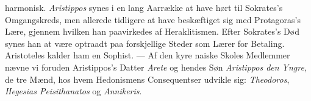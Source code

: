 \documentclass[12pt,a4paper]{book}
\newcommand{\gk}[1]{\textit{#1}}
\begin{document}
harmonisk. \emph{Aristippos} synes i en lang Aarrække at have
hørt til Sokrates's Omgangskreds, men allerede tidligere at
have beskæftiget sig med Protagoras's Lære, gjennem hvilken
han paavirkedes af Heraklitismen. Efter Sokrates's Død synes
han at være optraadt paa forskjellige Steder som Lærer for
Betaling. Aristoteles kalder ham en Sophist. --- Af den kyre\-%
naiske Skoles Medlemmer nævne vi foruden Aristippos's Datter
\emph{Arete} og hendes Søn \emph{Aristippos den Yngre}, de tre
Mænd, hos hvem Hedonismens Consequentser udvikle sig:
\emph{Theodoros}, \emph{Hegesias Peisithanatos} og \emph{Annikeris}.
\end{document}
